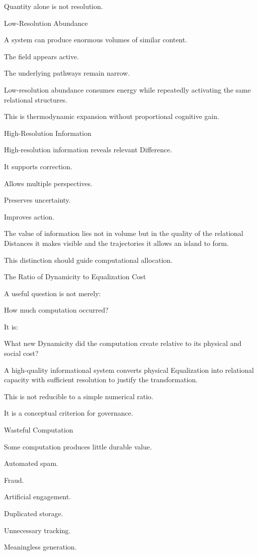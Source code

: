 Quantity alone is not resolution.

Low-Resolution Abundance

A system can produce enormous volumes of similar content.

The field appears active.

The underlying pathways remain narrow.

Low-resolution abundance consumes energy while repeatedly activating the same relational structures.

This is thermodynamic expansion without proportional cognitive gain.

High-Resolution Information

High-resolution information reveals relevant Difference.

It supports correction.

Allows multiple perspectives.

Preserves uncertainty.

Improves action.

The value of information lies not in volume but in the quality of the relational Distances it makes visible and the trajectories it allows an island to form.

This distinction should guide computational allocation.

The Ratio of Dynamicity to Equalization Cost

A useful question is not merely:

How much computation occurred?

It is:

What new Dynamicity did the computation create relative to its physical and social cost?

A high-quality informational system converts physical Equalization into relational capacity with sufficient resolution to justify the transformation.

This is not reducible to a simple numerical ratio.

It is a conceptual criterion for governance.

Wasteful Computation

Some computation produces little durable value.

Automated spam.

Fraud.

Artificial engagement.

Duplicated storage.

Unnecessary tracking.

Meaningless generation.

